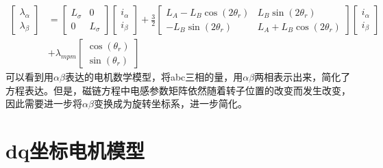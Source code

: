 \begin{align}\label{eq:fab1}
\begin{bmatrix}
\lambda_{\alpha}\\\lambda_{\beta}
\end{bmatrix}
&=
\begin{bmatrix}
L_{\sigma}&0\\0&L_{\sigma}
\end{bmatrix}
\begin{bmatrix}
i_{\alpha}\\i_{\beta}
\end{bmatrix}
+
\frac{3}{2}\begin{bmatrix}
L_{A}-L_{B}\cos(2\theta_{r})&L_{B}\sin(2\theta_{r})\\-L_{B}\sin(2\theta_{r})&L_{A}+L_{B}\cos(2\theta_{r})
\end{bmatrix}\begin{bmatrix}
i_{\alpha}\\i_{\beta}
\end{bmatrix}\nonumber\\&+
\lambda_{mpm}\begin{bmatrix}
\cos(\theta_{r})\\\sin(\theta_{r})
\end{bmatrix}
\end{align}
可以看到用$\alpha\beta$表达的电机数学模型，将abc三相的量，用$\alpha\beta$两相表示出来，简化了方程表达。但是，磁链方程中电感参数矩阵依然随着转子位置的改变而发生改变，因此需要进一步将$\alpha\beta$变换成为旋转坐标系，进一步简化。
\section{dq坐标电机模型}
